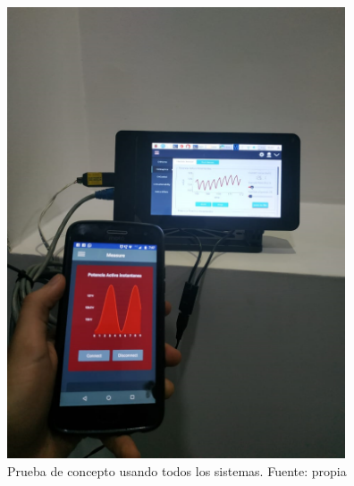 \begin{figure}[htbp]
	\centerline{\includegraphics[width=10cm]{./figuras/concepto_2.png}}
	\caption{Prueba de concepto usando todos los sistemas. Fuente: propia}
	\label{fig_33}
\end{figure}

